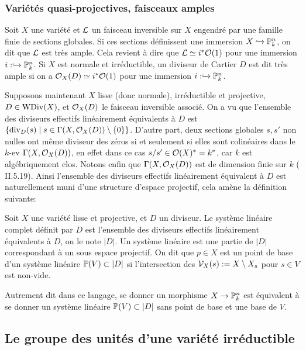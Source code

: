 \subsubsection{Variétés quasi-projectives, faisceaux amples}


\begin{defn}
Soit $X$ une variété et $\mathcal{L}$ un faisceau inversible sur $X$ engendré par une famille finie de sections globales. Si ces sections définissent une immersion $X\xhookrightarrow{}\mathbb{P}_k^n$, on dit que $\mathcal{L}$ est très ample. Cela revient à dire que $\mathcal{L}\simeq i^*\mathcal{O}(1)$  pour une immersion $i:\xhookrightarrow{}\mathbb{P}_k^n$. Si $X$ est normale et irréductible, un diviseur de Cartier $D$ est dit très ample si on a $\mathcal{O}_X(D)\simeq i^*\mathcal{O}(1)$ pour une immersion $i:\xhookrightarrow{}\mathbb{P}_k^n$.
\end{defn}

Supposons maintenant $X$ lisse (donc normale), irréductible et projective, $D\in \operatorname{WDiv}(X)$,  et $\mathcal{O}_X(D)$ le faisceau inversible associé. On a vu que l'ensemble des diviseurs effectifs linéairement équivalents à $D$ est $\lbrace \operatorname{div}_D(s)\mid s\in\Gamma(X,\mathcal{O}_X(D))\setminus\lbrace0\rbrace \rbrace$. D'autre part, deux sections globales $s, s'$ non nulles ont même diviseur des zéros si et seulement si elles sont colinéaires dans le $k$-ev $\Gamma(X, \mathcal{O}_X(D))$, en effet dans ce cas $s/s'\in \mathcal{O}(X)^*=k^*$, car $k$ est algébriquement clos. Notons enfin que $\Gamma(X, \mathcal{O}_X(D))$ est de dimension finie sur $k$ (\cite{Hartshorne} II.5.19). Ainsi l'ensemble des diviseurs effectifs linéairement équivalent à $D$ est naturellement muni d'une structure d'espace projectif, cela amène la définition suivante:
\begin{defn}
Soit $X$ une variété lisse et projective, et $D$ un diviseur. Le système linéaire complet définit par $D$ est l'ensemble des diviseurs effectifs linéairement équivalents à $D$, on le note $|D|$. Un système linéaire est une partie de $|D|$ correspondant à un sous espace projectif. On dit que $p\in X$ est un point de base d'un système linéaire $\mathbb{P}(V)\subset |D|$ si l'intersection des $\mathcal{V}_X(s):=X\setminus X_s$ pour $s\in V$ est non-vide. 
\end{defn}

Autrement dit dans ce langage, se donner un morphisme $X\rightarrow \mathbb{P}^n_k$ est équivalent à se donner un système linéaire $\mathbb{P}(V)\subset |D|$ sans point de base et une base de $V$.


\subsection{Le groupe des unités d'une variété irréductible}
\label{unitGroupFiniteType}


